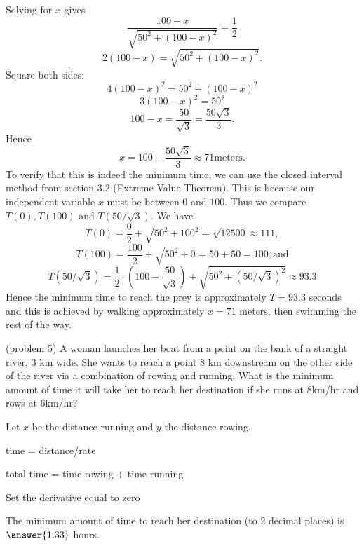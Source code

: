 \documentclass[handout]{ximera}
\begin{document}
\begin{example}[example 5]
Solving for $x$ gives
\[
\frac{100 - x}{\sqrt{50^2 + (100-x)^2}} = \frac12
\]
\[
2(100 - x) = \sqrt{50^2 + (100-x)^2}.
\]
Square both sides:
\[
4(100-x)^2 = 50^2 + (100-x)^2
\]
\[
3(100-x)^2 = 50^2
\]
\[
100-x = \frac{50}{\sqrt{3}} = \frac{50\sqrt{3}}{3}.
\]
Hence
\[
x = 100 - \frac{50\sqrt{3}}{3} \approx 71 \text{meters}.
\]
To verify that this is indeed the minimum time, we can use the closed interval method from section 3.2 (Extreme Value Theorem).
This is because our independent variable $x$ must be between $0$ and $100$. Thus we compare $T(0), T(100)$ and $T(50/\sqrt 3)$.
We have 
\[
T(0) = \frac02 +  \sqrt{50^2 + 100^2} = \sqrt{12500} \approx 111,
\]
\[
T(100) = \frac{100}{2} +  \sqrt{50^2 + 0} = 50 + 50 = 100, \text{and}
\]
\[
T(50/\sqrt 3) = \frac12 \cdot \left(100- \frac{50}{\sqrt 3}\right) +  \sqrt{50^2 + (50/\sqrt 3)^2} \approx 93.3
\]
Hence the minimum time to reach the prey is approximately $T=93.3$ seconds and this is achieved by walking approximately $x =71$ meters, 
then swimming the rest of the way.
\end{example}


\begin{problem}(problem 5)
A woman launches her boat from a point on the bank of a straight river, 3 km wide. 
She wants to reach a point 8 km downstream on the other side of the river via a combination of rowing and running.
What is the minimum amount of time it will take her to reach her destination if she runs at 8km/hr and rows at 6km/hr?


\begin{hint}
Let $x$ be the distance running and $y$ the distance rowing.
\end{hint}
\begin{hint}
time = distance/rate
\end{hint}
\begin{hint}
total time = time rowing + time running
\end{hint}
\begin{hint}
Set the derivative equal to zero
\end{hint}

The minimum amount of time to reach her destination (to 2 decimal places) is $\answer{1.33}$ hours.
\end{problem}
\end{document}
